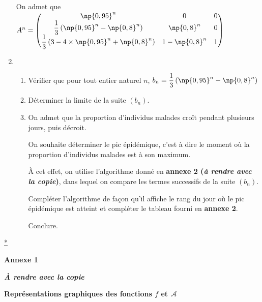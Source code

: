 \documentclass[10pt]{article}
\begin{document}
\begin{enumerate}
On admet que $A^n =\begin{pmatrix}
\np{0,95}^n&0&0\\
\dfrac13\left(\np{0,95}^n-\np{0,8}^n\right)&\np{0,8}^n&0\\
\dfrac13\left(3-4\times\np{0,95}^n+\np{0,8}^n\right)&1-\np{0,8}^n&1
\end{pmatrix}$

\item 
	\begin{enumerate}
		\item Vérifier que pour tout entier naturel $n$, $b_n=\dfrac13\left(\np{0,95}^n-\np{0,8}^n\right)$
		\item Déterminer la limite de la suite $\left(b_n\right)$.
		\item On admet que la proportion d'individus malades croît pendant plusieurs jours, puis décroit.

On souhaite déterminer le pic épidémique, c'est à dire le moment où la proportion d'individus malades est à son maximum.

À cet effet, on utilise l'algorithme donné en \textbf{annexe 2 (\emph{à rendre avec la copie})}, dans lequel on compare les termes successifs de la suite $(b_n)$.

Compléter l'algorithme de façon qu'il affiche le rang du jour où le pic épidémique est atteint et compléter le tableau fourni en \textbf{annexe 2}.

Conclure.
	\end{enumerate}
\end{enumerate}

\hyperlink{Index}{*}

\newpage
\textbf{Annexe 1}

\textbf{\emph{À rendre avec la copie}}

\begin{center}
\textbf{}

\textbf{Représentations graphiques des fonctions $f$ et $\mathcal{A}$}
\end{center}
\vspace{1cm}
\end{document}
